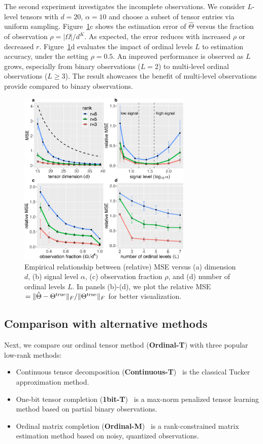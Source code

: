 \documentclass{article}
\theoremstyle{plain}
\theoremstyle{definition}
\begin{document}
The second experiment investigates the incomplete observations. We consider $L$-level tensors with $d=20$, $\alpha=10$ and choose a subset of tensor entries via uniform sampling. Figure~\ref{fig:finite}c shows the estimation error of $\hat \Theta$ versus the fraction of observation $\rho=|\Omega|/d^K$. As expected, the error reduces with increased $\rho$ or decreased $r$. Figure~\ref{fig:finite}d evaluates the impact of ordinal levels $L$ to estimation accuracy, under the setting $\rho=0.5$. An improved performance is observed as $L$ grows, especially from binary observations ($L=2$) to multi-level ordinal observations ($L\geq 3$). The result showcases the benefit of multi-level observations provide compared to binary observations. 

\begin{figure}[http]
\includegraphics[width=8.3cm]{panel.pdf}
\vspace{-.4cm}
\caption{Empirical relationship between (relative) MSE versus (a) dimension $d$, (b) signal level $\alpha$, (c) observation fraction $\rho$, and (d) number of ordinal levels $L$. In panels (b)-(d), we plot the relative MSE $=\lVert\hat \Theta-\Theta^{\text{true}}\rVert_F/\lVert\Theta^{\text{true}}\rVert_F$ for better visualization.}
\label{fig:finite}
\vspace{-.2cm}
\end{figure}


\subsection{Comparison with alternative methods}
Next, we compare our ordinal tensor method ({\bf Ordinal-T}) with three popular low-rank methods: 

\begin{itemize}[itemsep=-.5pt,topsep=-.5pt,leftmargin=*,partopsep=-.5pt]
\item Continuous tensor decomposition ({\bf Continuous-T})~\cite{filipovic2015tucker,oh2018scalable} is the classical Tucker approximation method. 
\item One-bit tensor completion ({\bf 1bit-T})~\cite{ghadermarzy2018learning} is a max-norm penalized tensor learning method based on partial binary observations. 
\item Ordinal matrix completion ({\bf Ordinal-M})~\cite{bhaskar2016probabilistic} is a rank-constrained matrix estimation method based on noisy, quantized observations. 
\end{itemize}
\end{document}
